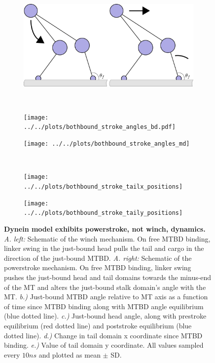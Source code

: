 \documentclass[9pt,twocolumn,twoside]{pnas-new}
\begin{document}
\begin{figure}[tbhp]
  \centering
  \begin{subfigure}[]{0.8\columnwidth}\caption{}\vspace{5pt}\includegraphics[width=\columnwidth]{figures/winch-powerstroke-cartoon}\end{subfigure}\vspace{10pt}\\
  \begin{subfigure}[]{0.5\columnwidth}\caption{}\texttt{[image: ../../plots/bothbound\_stroke\_angles\_bd.pdf]}\end{subfigure}%
  \begin{subfigure}[]{0.5\columnwidth}\caption{}\texttt{[image: ../../plots/bothbound\_stroke\_angles\_md]}\end{subfigure}\\
  \begin{subfigure}[]{0.5\columnwidth}\caption{}\texttt{[image: ../../plots/bothbound\_stroke\_tailx\_positions]}\end{subfigure}%
  \begin{subfigure}[]{0.5\columnwidth}\caption{}\texttt{[image: ../../plots/bothbound\_stroke\_taily\_positions]}\end{subfigure}
  \caption{\textbf{Dynein model exhibits powerstroke, not winch, dynamics.} \textit{A. left: } Schematic of the winch mechanism. On free MTBD binding, linker swing in the just-bound head pulls the tail and cargo in the direction of the just-bound MTBD. \textit{A. right: } Schematic of the powerstroke mechanism. On free MTBD binding, linker swing pushes the just-bound head and tail domains towards the minus-end of the MT and alters the just-bound stalk domain's angle with the MT. \textit{b.) } Just-bound MTBD angle relative to MT axis as a function of time since MTBD binding along with MTBD angle equilibrium (blue dotted line). \textit{c.) } Just-bound head angle, along with prestroke equilibrium (red dotted line) and poststroke equilibrium (blue dotted line). \textit{d.) } Change in tail domain x coordinate since MTBD binding. \textit{e.) } Value of tail domain y coordinate. All values sampled every $10 ns$ and plotted as mean $\pm$ SD.}
\label{fig:stroke}
\end{figure}
\end{document}
